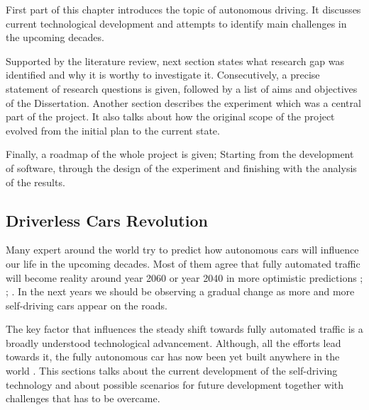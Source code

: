 \documentclass[11pt,english]{article}
\begin{document}
\par
First part of this chapter introduces the topic of autonomous driving. It discusses current technological development and attempts to identify main challenges in the upcoming decades.  
\par
Supported by the literature review, next section states what research gap was identified and why it is worthy to investigate it. Consecutively, a precise statement of research questions is given, followed by a list of aims and objectives of the Dissertation. Another section describes the experiment which was a central part of the project. It also talks about how the original scope of the project evolved from the initial plan to the current state.
\par
Finally, a roadmap of the whole project is given; Starting from the development of software, through the design of the experiment and finishing with the analysis of the results.






\subsection{Driverless Cars Revolution}

Many expert around the world try to predict how autonomous cars will influence our life in the upcoming decades. Most of them agree that fully automated traffic will become reality around year 2060 or year 2040 in more optimistic predictions \citep{kitti2012we}; \citep{litman2014autonomous}; \citep{sivak2015road}. In the next years we should be observing a gradual change as more and more self-driving cars appear on the roads. 
\par
The key factor that influences the steady shift towards fully automated traffic is a broadly understood technological advancement. Although, all the efforts lead towards it, the fully autonomous car has now been yet built anywhere in the world \citep{litman2014autonomous}. 
This sections talks about the current development of the self-driving  technology and about possible scenarios for future development together with challenges that has to be overcame.





\end{document}
